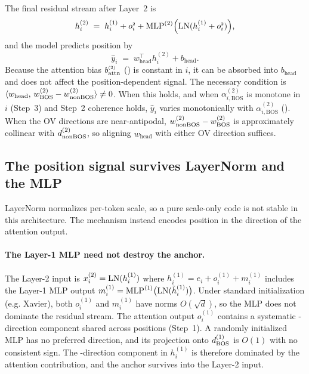 \documentclass{article}
\theoremstyle{plain}
\theoremstyle{definition}
\theoremstyle{remark}
\begin{document}
The final residual stream after Layer~2 is
\begin{equation}
h_i^{(2)} \;=\; h_i^{(1)} + o_{i}^{\scriptscriptstyle 2} + \operatorname{MLP}^{(2)}\!\Big(\mathrm{LN}(h_i^{(1)} + o_{i}^{\scriptscriptstyle 2})\Big),
\end{equation}
and the model predicts position by
\begin{equation}
\hat y_i \;=\; w_{\text{head}}^\top h_i^{(2)} + b_{\text{head}}.
\end{equation}
Because the attention bias $b_{\text{attn}}^{\scriptscriptstyle (2)}$ () is constant in $i$, it can be absorbed into $b_{\text{head}}$ and does not affect the
position-dependent signal.
The necessary condition is $\langle w_{\text{head}},\, w_{\text{BOS}}^{(2)}-w_{\text{nonBOS}}^{(2)}\rangle \neq 0$.
When this holds, and when $\alpha^{(2)}_{i,\mathrm{BOS}}$ is monotone in $i$ (Step~3) and Step~2 coherence holds, $\hat y_i$ varies monotonically with $\alpha^{(2)}_{i,\mathrm{BOS}}$ ().
When the OV directions are near-antipodal, $w_{\text{nonBOS}}^{(2)}-w_{\text{BOS}}^{(2)}$ is approximately collinear with $d_{\text{nonBOS}}^{(2)}$, so aligning $w_{\text{head}}$ with either OV direction suffices.

\subsection{The position signal survives LayerNorm and the MLP}
\label{subsec:mech_implications}

LayerNorm normalizes per-token scale, so a pure scale-only code is not stable in this architecture.
The mechanism instead encodes position in the direction of the attention output.

\paragraph{The Layer-1 MLP need not destroy the \bos anchor.}
The Layer-2 input is $x_i^{(2)} = \mathrm{LN}(h_i^{(1)})$ where $h_i^{(1)} = e_i + o_i^{(1)} + m_i^{(1)}$ includes the Layer-1 MLP output $m_i^{(1)} = \operatorname{MLP}^{(1)}\!\big(\mathrm{LN}(\tilde h_i^{(1)})\big)$.
Under standard initialization (e.g. Xavier), both $o_i^{(1)}$ and $m_i^{(1)}$ have norms $O(\sqrt{d})$, so the MLP does not dominate the residual stream.
The attention output $o_i^{(1)}$ contains a systematic \bos-direction component shared across positions (Step~1).
A randomly initialized MLP has no preferred direction, and its projection onto $d_{\text{BOS}}^{(1)}$ is $O(1)$ with no consistent sign.
The \bos-direction component in $h_i^{(1)}$ is therefore dominated by the attention contribution, and the \bos anchor survives into the Layer-2 input.
\end{document}
